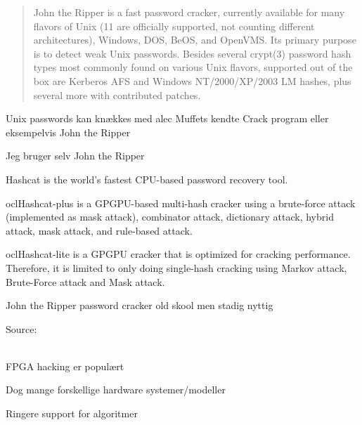 \documentclass[Screen16to9,17pt]{foils}
\begin{document}

\begin{quote}
John the Ripper is a fast password cracker, currently available for
many flavors of Unix (11 are officially supported, not counting
different architectures), Windows, DOS, BeOS, and OpenVMS. Its primary
purpose is to detect weak Unix passwords. Besides several crypt(3)
password hash types most commonly found on various Unix flavors,
supported out of the box are Kerberos AFS and Windows NT/2000/XP/2003
LM hashes, plus several more with contributed patches.
\end{quote}

\begin{list1}
\item Unix passwords kan knækkes med alec Muffets kendte Crack program
  eller eksempelvis John the Ripper 
\item Jeg bruger selv John the Ripper
\end{list1}


\begin{list2}
\item Hashcat is the world's fastest CPU-based password recovery tool.
\item oclHashcat-plus is a GPGPU-based multi-hash cracker using a brute-force attack (implemented as mask attack), combinator attack, dictionary attack, hybrid attack, mask attack, and rule-based attack.
\item oclHashcat-lite is a GPGPU cracker that is optimized for cracking performance. Therefore, it is limited to only doing single-hash cracking using Markov attack, Brute-Force attack and Mask attack.
\item John the Ripper password cracker old skool men stadig nyttig
\end{list2}

Source:\\
\\




\begin{list1}
\item FPGA hacking er populært
\item Dog mange forskellige hardware systemer/modeller
\item Ringere support for algoritmer
\end{list1}
\end{document}
